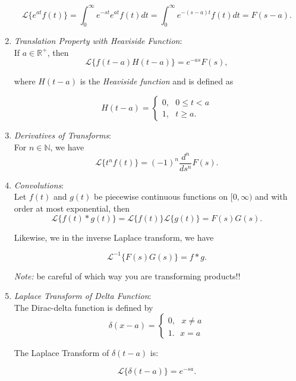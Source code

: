 \begin{enumerate}
$$\mathscr{L}\{ e^{at} f(t) \} = \int_0^\infty e^{-st} e^{at} f(t) dt = \int_0^\infty e^{-(s-a)t} f(t) dt = F(s-a).$$

%
%
\item \emph{Translation Property with Heaviside Function}: \\

If $a\in\mathbb{R}^{+}$, then $$\mathscr{L}\{ f(t-a) H(t-a) \} = e^{-as} F(s),$$

where $H(t-a)$ is the \emph{Heaviside function} and is defined as 

$$H(t-a) = \left\{ \begin{array}{c} 0, \ \ \ 0\leq t < a \\ 
1, \ \ \ t\geq a. 
\end{array} \right. $$

%
%
\item \emph{Derivatives of Transforms}: \\

For $n\in\mathbb{N}$, we have $$\mathscr{L}\{ t^n f(t) \} = (-1)^n \frac{d^n}{ds^n} F(s).$$


%
%
\item \emph{Convolutions}: \\

Let $f(t)$ and $g(t)$ be piecewise continuous functions on $[0,\infty)$ and with order at most exponential, then $$\mathscr{L}\{ f(t)\ast g(t) \} = \mathscr{L}\{ f(t) \} \mathscr{L}\{ g(t) \} = F(s)G(s).$$

Likewise, we in the inverse Laplace transform, we have

$$\mathscr{L}^{-1}\{ F(s) G(s) \} = f\ast g.$$

\emph{Note:} be careful of which way you are transforming products!!


%
% 
\item \emph{Laplace Transform of Delta Function}:\\

The Dirac-delta function is defined by $$\delta(x-a) = \left\{ \begin{array}{c} 0, \ \ \ x\neq a\\ 1. \ \ \ x=a \end{array} \right. $$

The Laplace Transform of $\delta(t-a)$ is:

$$\mathscr{L}\{ \delta(t-a) \} = e^{-sa}.$$

\end{enumerate}


